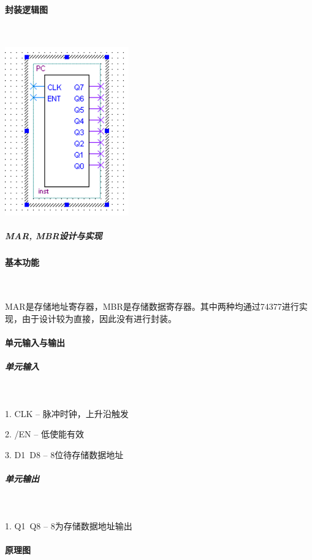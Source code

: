 \documentclass[UTF8]{ctexart}
\begin{document}
    \paragraph{封装逻辑图}

      ~

    \includegraphics[width=0.4\textwidth]{./img/程序计数器PC封装逻辑图.png}

    \subparagraph{MAR, MBR设计与实现}
    \paragraph{基本功能}

    ~

    MAR是存储地址寄存器，MBR是存储数据寄存器。其中两种均通过74377进行实现，由于设计较为直接，因此没有进行封装。

    \paragraph{单元输入与输出}

    \subparagraph{单元输入}

    ~

    1. CLK -- 脉冲时钟，上升沿触发

    2. /EN -- 低使能有效

    3. D1~D8 -- 8位待存储数据地址

    \subparagraph{单元输出}

    ~

    1. Q1~Q8 -- 8为存储数据地址输出

    \paragraph{原理图}

    ~
    
\end{document}
